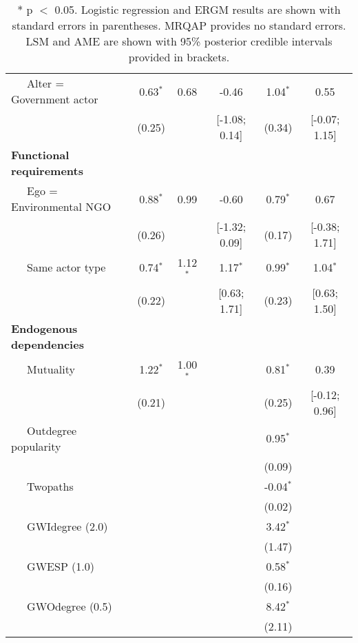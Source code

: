 \begin{table}[ht]
\begin{tabular}{lccccc}
  $\;\;\;\;$ Alter = Government actor & 0.63$^{\ast}$ & 0.68 & -0.46 & 1.04$^{\ast}$ & 0.55 \\ 
   & (0.25) &  & [-1.08; 0.14] & (0.34) & [-0.07; 1.15] \\ 
  \textbf{Functional requirements} &  &  &  &  &  \\ 
  $\;\;\;\;$ Ego = Environmental NGO & 0.88$^{\ast}$ & 0.99 & -0.60 & 0.79$^{\ast}$ & 0.67 \\ 
   & (0.26) &  & [-1.32; 0.09] & (0.17) & [-0.38; 1.71] \\ 
  $\;\;\;\;$ Same actor type & 0.74$^{\ast}$ & 1.12$^{\ast}$ & 1.17$^{\ast}$ & 0.99$^{\ast}$ & 1.04$^{\ast}$ \\ 
   & (0.22) &  & [0.63; 1.71] & (0.23) & [0.63; 1.50] \\ 
  \textbf{Endogenous dependencies} &  &  &  &  &  \\ 
  $\;\;\;\;$ Mutuality & 1.22$^{\ast}$ & 1.00$^{\ast}$ &  & 0.81$^{\ast}$ & 0.39 \\ 
   & (0.21) &  &  & (0.25) & [-0.12; 0.96] \\ 
  $\;\;\;\;$ Outdegree popularity &  &  &  & 0.95$^{\ast}$ &  \\ 
   &  &  &  & (0.09) &  \\ 
  $\;\;\;\;$ Twopaths &  &  &  & -0.04$^{\ast}$ &  \\ 
   &  &  &  & (0.02) &  \\ 
  $\;\;\;\;$ GWIdegree (2.0) &  &  &  & 3.42$^{\ast}$ &  \\ 
   &  &  &  & (1.47) &  \\ 
  $\;\;\;\;$ GWESP (1.0) &  &  &  & 0.58$^{\ast}$ &  \\ 
   &  &  &  & (0.16) &  \\ 
  $\;\;\;\;$ GWOdegree (0.5) &  &  &  & 8.42$^{\ast}$ &  \\ 
   &  &  &  & (2.11) &  \\ 
   \hline
\hline
\end{tabular}
\endgroup
\caption{* p $<$ 0.05. Logistic regression and ERGM results are shown with standard errors in parentheses. MRQAP provides no standard errors. LSM and AME are shown with 95\% posterior credible intervals provided in brackets.} 
\label{tab:regTable}
\end{table}
